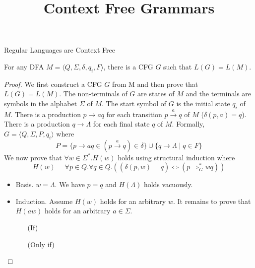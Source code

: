 \documentclass{beamer}
\title{\huge\bf Context Free Grammars}
\date{}
\begin{document}
\maketitle

\begin{frame}[allowframebreaks]{Regular Languages are Context Free}
\begin{theorem} For any DFA $M=\langle Q, \Sigma, \delta, q_i, F \rangle$, 
	there is a CFG $G$ such that $L(G)=L(M)$. 
\end{theorem} \pause 

\begin{proof} We first construct a CFG $G$ from M and then prove that
$L(G)=L(M)$.
The non-terminals of $G$ are states of $M$ and the terminals are symbols in the
alphabet $\Sigma$ of $M$. The start symbol of $G$ is the initial state $q_i$ of
$M$. There is a production $p\rightarrow aq$ for each transition 
$p\xrightarrow{a} q$ of $M$ ($\delta(p,a)=q$). 
There is a production $q\rightarrow \Lambda$ for each final state $q$ of $M$. Formally, 
$G=\langle Q,\Sigma, P, q_i\rangle$ where 
\[ P =\{ p\rightarrow aq \in (p\xrightarrow{a} q)\in\delta \}\cup \{ q\rightarrow \Lambda \mid q\in F\} 
\] 
We now prove that $\forall w\in \Sigma^*.H(w)$ holds using structural induction where 
\[ H(w)=\forall p\in Q.\forall q\in Q. ((\bar{\delta}(p, w)=q) \Longleftrightarrow (p\Rightarrow^*_{G} wq))
\] 
\begin{itemize}
  \item Basis. $w=\Lambda$. We have $p=q$ and $H(\Lambda)$ holds vacuously. 
  \item Induction. Assume $H(w)$ holds for an arbitrary $w$. 
  	It remains to prove that $H(aw)$ holds for an arbitrary $a\in\Sigma$. 
  	\begin{itemize}
  	  \item [(If)] 
  	  \item [ (Only if)] 
  	\end{itemize}
\end{itemize}
\end{proof}

\end{frame}
\end{document}
